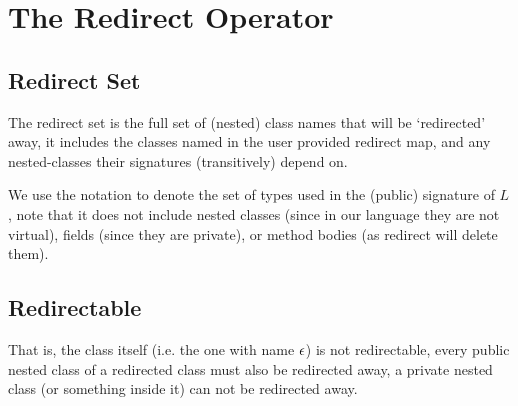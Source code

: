 \section{The Redirect Operator}

\subsection{Redirect Set}
The redirect set is the full set of (nested) class names that will be `redirected' away, it includes the classes named in the user provided redirect map, and any nested-classes their signatures (transitively) depend on.

\begin{defs}
\end{defs}

We use the notation  to denote the set of types used in the (public) signature of $L$, note that it does not include nested classes (since in our language they are not virtual),  fields (since they are private), or method bodies (as redirect will delete them).

\subsection{Redirectable}
\begin{defs}
\end{defs}
That is, the class itself (i.e. the one with name $\epsilon$) is not redirectable, every public nested class of a redirected class must also be redirected away, a private nested class (or something inside it) can not be redirected away.


